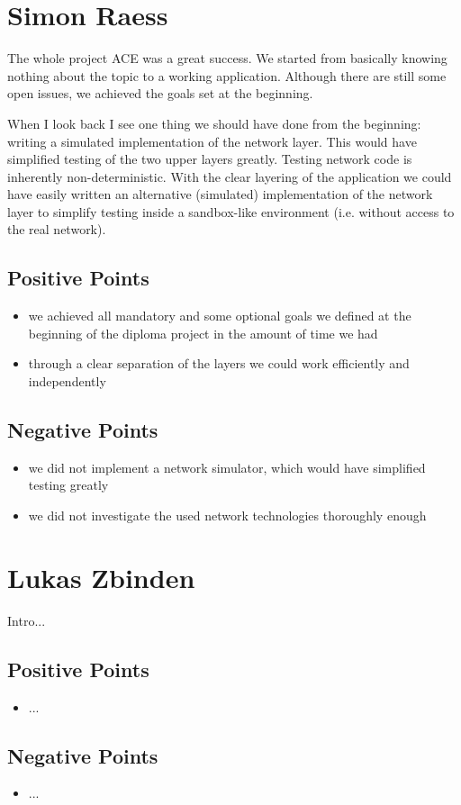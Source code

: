 \section{Simon Raess}
The whole project ACE was a great success. We started from basically knowing
nothing about the topic to a working application. Although there are still
some open issues, we achieved the goals set at the beginning. 

When I look back I see one thing we should have done from the beginning:
writing a simulated implementation of the network layer. This would have
simplified testing of the two upper layers greatly. Testing network code is inherently non-deterministic. With the clear layering of the application 
we could have easily written an alternative (simulated) implementation of
the network layer to simplify testing inside a sandbox-like environment (i.e.
without access to the real network).

\subsection{Positive Points}
\begin{itemize}
 \item we achieved all mandatory and some optional goals we defined at the beginning of the diploma project in the amount of time we had
 \item through a clear separation of the layers we could work efficiently and independently
\end{itemize}

\subsection{Negative Points}
\begin{itemize}
 \item we did not implement a network simulator, which would have simplified testing greatly
 \item we did not investigate the used network technologies thoroughly enough
\end{itemize}



\section{Lukas Zbinden}
Intro...
\subsection{Positive Points}
\begin{itemize}
\item ...
\end{itemize}

\subsection{Negative Points}
\begin{itemize}
\item ...
\end{itemize}

